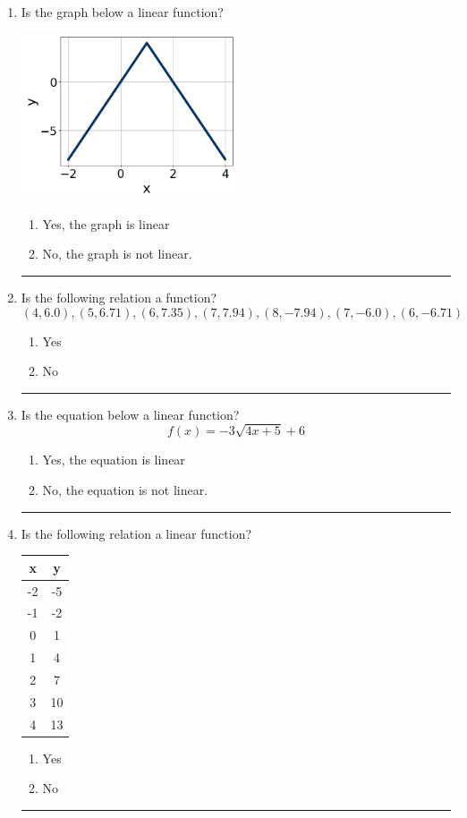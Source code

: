 \documentclass[14pt]{extbook}
\newcommand{\litem}[1]{\item#1\hspace*{-1cm}\rule{\textwidth}{0.4pt}}
\begin{document}
\begin{enumerate}
\litem{
Is the graph below a linear function?
\begin{center}
    \includegraphics[width=0.5\textwidth]{../Figures/MA_8_F_1_2_graphG.png}
\end{center}
\begin{enumerate}[label=\Alph*.]
\item Yes, the graph is linear
\item No, the graph is not linear.

\end{enumerate} }
\litem{
Is the following relation a function?\[ (4, 6.0), (5, 6.71), (6, 7.35), (7, 7.94), (8, -7.94), (7, -6.0), (6, -6.71) \]\begin{enumerate}[label=\Alph*.]
\item Yes
\item No

\end{enumerate} }
\litem{
Is the equation below a linear function?\[ f(x) = {-3}\sqrt{4x + 5}+6 \]\begin{enumerate}[label=\Alph*.]
\item Yes, the equation is linear
\item No, the equation is not linear.

\end{enumerate} }
\litem{
Is the following relation a linear function?

\begin{tabular}{c|c}
x &y\tabularnewline \hline
-2 &-5\tabularnewline \hline
-1 &-2\tabularnewline \hline
0 &1\tabularnewline \hline
1 &4\tabularnewline \hline
2 &7\tabularnewline \hline
3 &10\tabularnewline \hline
4 &13\end{tabular}\begin{enumerate}[label=\Alph*.]
\item Yes
\item No

\end{enumerate} }
\end{enumerate}
\end{document}
